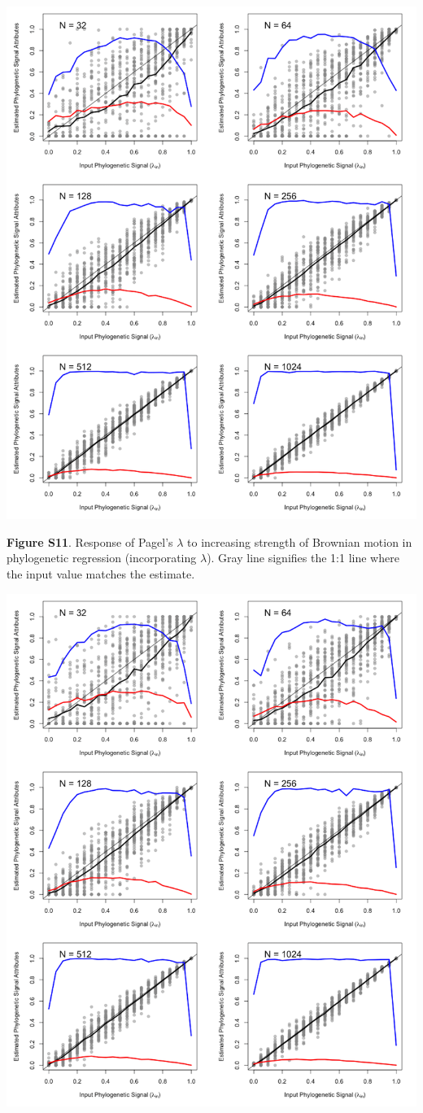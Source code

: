 \documentclass[
]{article}
\begin{document}
\includegraphics[width=0.95\linewidth]{fig.S11}

\textbf{Figure S11}. Response of Pagel's \(\lambda\) to increasing
strength of Brownian motion in phylogenetic regression (incorporating
\(\lambda\)). Gray line signifies the 1:1 line where the input value
matches the estimate.

\includegraphics[width=0.95\linewidth]{fig.S12}
\end{document}
